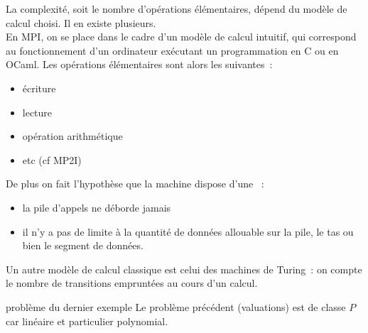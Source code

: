 \begin{remarque}{}{}
    La complexité, soit le nombre d'opérations élémentaires, dépend du modèle de calcul choisi. Il en existe plusieurs.\\
    En MPI, on se place dans le cadre d'un modèle de calcul intuitif, qui correspond au fonctionnement d'un ordinateur exécutant un programmation en C ou en OCaml. Les opérations élémentaires sont alors les suivantes~:
    \begin{itemize}
        \item écriture
        \item lecture
        \item opération arithmétique
        \item etc (cf MP2I)
    \end{itemize}
    De plus on fait l'hypothèse que la machine dispose d'une ~:
    \begin{itemize}
        \item la pile d'appels ne déborde jamais
        \item il n'y a pas de limite à la quantité de données allouable sur la pile, le tas ou bien le segment de données.
    \end{itemize}
    Un autre modèle de calcul classique est celui des machines de Turing~: on compte le nombre de transitions empruntées au cours d'un calcul.
\end{remarque}

\begin{exemple}{}{problème du dernier exemple}
    Le problème précédent (valuations) est de classe $P$ car linéaire et particulier polynomial.
\end{exemple}

